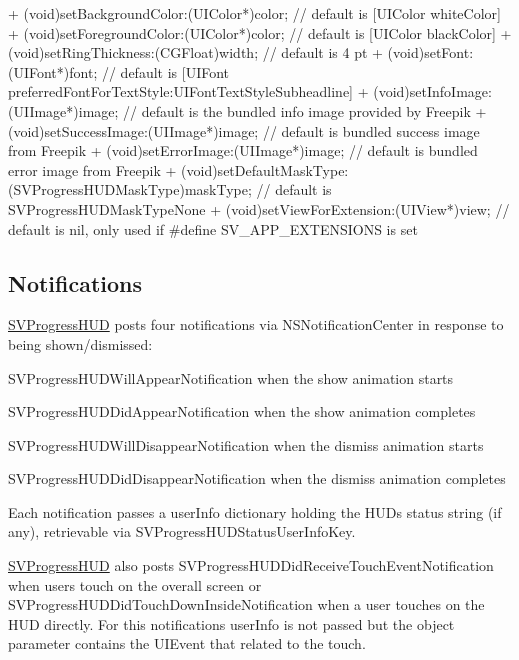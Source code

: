 \begin{DoxyCode}
+ (void)setBackgroundColor:(UIColor*)color;                 // default is [UIColor whiteColor]
+ (void)setForegroundColor:(UIColor*)color;                 // default is [UIColor blackColor]
+ (void)setRingThickness:(CGFloat)width;                    // default is 4 pt
+ (void)setFont:(UIFont*)font;                              // default is [UIFont
       preferredFontForTextStyle:UIFontTextStyleSubheadline]
+ (void)setInfoImage:(UIImage*)image;                       // default is the bundled info image provided
       by Freepik
+ (void)setSuccessImage:(UIImage*)image;                    // default is bundled success image from
       Freepik
+ (void)setErrorImage:(UIImage*)image;                      // default is bundled error image from Freepik
+ (void)setDefaultMaskType:(SVProgressHUDMaskType)maskType; // default is SVProgressHUDMaskTypeNone
+ (void)setViewForExtension:(UIView*)view;                  // default is nil, only used if #define
       SV\_APP\_EXTENSIONS is set
\end{DoxyCode}


\subsection*{Notifications}

{\ttfamily \mbox{\hyperlink{interface_s_v_progress_h_u_d}{S\+V\+Progress\+H\+UD}}} posts four notifications via {\ttfamily N\+S\+Notification\+Center} in response to being shown/dismissed\+:
\begin{DoxyItemize}
\item {\ttfamily S\+V\+Progress\+H\+U\+D\+Will\+Appear\+Notification} when the show animation starts
\item {\ttfamily S\+V\+Progress\+H\+U\+D\+Did\+Appear\+Notification} when the show animation completes
\item {\ttfamily S\+V\+Progress\+H\+U\+D\+Will\+Disappear\+Notification} when the dismiss animation starts
\item {\ttfamily S\+V\+Progress\+H\+U\+D\+Did\+Disappear\+Notification} when the dismiss animation completes
\end{DoxyItemize}

Each notification passes a {\ttfamily user\+Info} dictionary holding the H\+UD\textquotesingle{}s status string (if any), retrievable via {\ttfamily S\+V\+Progress\+H\+U\+D\+Status\+User\+Info\+Key}.

{\ttfamily \mbox{\hyperlink{interface_s_v_progress_h_u_d}{S\+V\+Progress\+H\+UD}}} also posts {\ttfamily S\+V\+Progress\+H\+U\+D\+Did\+Receive\+Touch\+Event\+Notification} when users touch on the overall screen or {\ttfamily S\+V\+Progress\+H\+U\+D\+Did\+Touch\+Down\+Inside\+Notification} when a user touches on the H\+UD directly. For this notifications {\ttfamily user\+Info} is not passed but the object parameter contains the {\ttfamily U\+I\+Event} that related to the touch.


